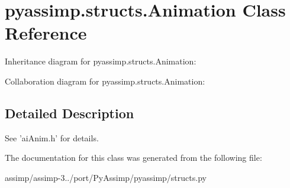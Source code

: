 \hypertarget{classpyassimp_1_1structs_1_1_animation}{\section{pyassimp.\+structs.\+Animation Class Reference}
\label{classpyassimp_1_1structs_1_1_animation}
}


Inheritance diagram for pyassimp.\+structs.\+Animation\+:


Collaboration diagram for pyassimp.\+structs.\+Animation\+:


\subsection{Detailed Description}
\begin{DoxyVerb}See 'aiAnim.h' for details.
\end{DoxyVerb}
 

The documentation for this class was generated from the following file\+:\begin{DoxyCompactItemize}
\item 
assimp/assimp-\/3../port/\+Py\+Assimp/pyassimp/structs.\+py\end{DoxyCompactItemize}
